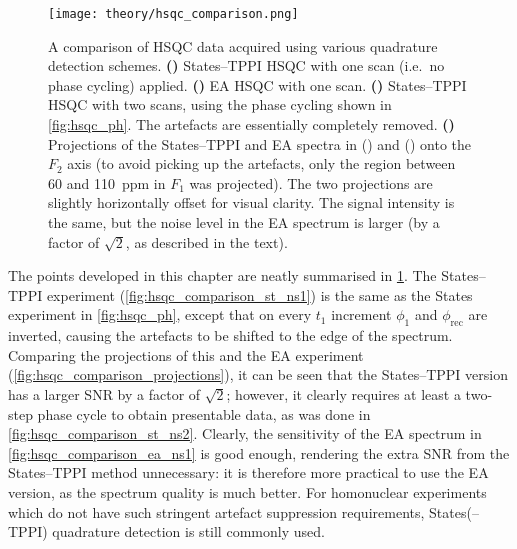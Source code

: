\begin{figure}[htbp]
    \centering
    \texttt{[image: theory/hsqc\_comparison.png]}%
    {\label{fig:hsqc_comparison_st_ns1}}%
    {\label{fig:hsqc_comparison_ea_ns1}}%
    {\label{fig:hsqc_comparison_st_ns2}}%
    {\label{fig:hsqc_comparison_projections}}%
    \caption[Experimental comparison of States--TPPI and echo--antiecho HSQC]{
        A comparison of HSQC data acquired using various quadrature detection schemes.
        \textbf{()} States--TPPI HSQC with one scan (i.e.\ no phase cycling) applied.
        \textbf{()} EA HSQC with one scan.
        \textbf{()} States--TPPI HSQC with two scans, using the phase cycling shown in \cref{fig:hsqc_ph}. The artefacts are essentially completely removed.
        \textbf{()} Projections of the States--TPPI and EA spectra in () and () onto the $F_2$ axis (to avoid picking up the artefacts, only the region between 60 and \qty{110}{ppm} in $F_1$ was projected).
        The two projections are slightly horizontally offset for visual clarity.
        The signal intensity is the same, but the noise level in the EA spectrum is larger (by a factor of $\sqrt{2}$, as described in the text).
    }
    \label{fig:hsqc_comparison}
\end{figure}

The points developed in this chapter are neatly summarised in \cref{fig:hsqc_comparison}.
The States--TPPI experiment (\cref{fig:hsqc_comparison_st_ns1}) is the same as the States experiment in \cref{fig:hsqc_ph}, except that on every $t_1$ increment $\phi_1$ and $\phi_\text{rec}$ are inverted, causing the artefacts to be shifted to the edge of the spectrum.
Comparing the projections of this and the EA experiment (\cref{fig:hsqc_comparison_projections}), it can be seen that the States--TPPI version has a larger SNR by a factor of $\sqrt{2}$; however, it clearly requires at least a two-step phase cycle to obtain presentable data, as was done in \cref{fig:hsqc_comparison_st_ns2}.
Clearly, the sensitivity of the EA spectrum in \cref{fig:hsqc_comparison_ea_ns1} is good enough, rendering the extra SNR from the States--TPPI method unnecessary: it is therefore more practical to use the EA version, as the spectrum quality is much better.
For homonuclear experiments which do not have such stringent artefact suppression requirements, States(--TPPI) quadrature detection is still commonly used.

